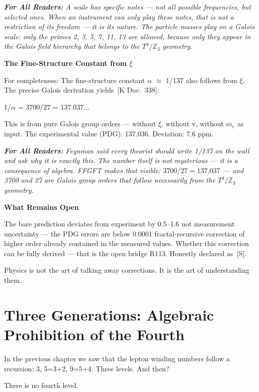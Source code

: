 \documentclass[11pt,oneside]{book}
\newcommand{\status}[1]{\penalty10000\,{\scriptsize\textcolor{gray!60}{[#1]}}}
\newenvironment{laierspur}{%
  \par\vspace{4pt}%
  \noindent\small\itshape\color{blue!60!black}%
  \textbf{For All Readers:}\enspace\ignorespaces}{%
  \par\vspace{4pt}\normalsize\normalfont\normalcolor}
\begin{document}
\begin{laierspur}
A scale has specific notes — not all possible frequencies, but selected
ones. When an instrument can only play these notes, that is not a
restriction of its freedom — it is its nature. The particle masses play on a
Galois scale: only the primes {2, 3, 5, 7, 11, 13} are allowed, because only
they appear in the Galois field hierarchy that belongs to the $T^4/\mathbb{Z}_3$
geometry.
\end{laierspur}

\textbf{The Fine-Structure Constant from $\xi$}

For completeness: The fine-structure constant $\alpha$ $\approx$ 1/137 also follows
from $\xi$. The precise Galois derivation yields \status{K Doc.~338}:

1/$\alpha$ = 3700/27 = 137.037...

This is from pure Galois group orders — without $\xi$, without v, without $m_e$
as input. The experimental value (PDG): 137.036. Deviation: 7.6 ppm.

\begin{laierspur}
Feynman said every theorist should write 1/137 on the wall and ask why
it is exactly this. The number itself is not mysterious --- it is a consequence
of algebra. FFGFT makes that visible:
$3700/27 = 137.037$ --- and 3700 and 27 are Galois group orders that follow
necessarily from the $T^4/\mathbb{Z}_3$ geometry.
\end{laierspur}

\textbf{What Remains Open}

The bare prediction deviates from experiment by 0.5–1.6%
not measurement uncertainty — the PDG errors are below 0.0001%
fractal-recursive correction of higher order already contained in the
measured values. Whether this correction can be fully derived — that is the
open bridge R113. Honestly declared as \status{S}.

Physics is not the art of talking away corrections. It is the art of
understanding them.


\chapter{Three Generations: Algebraic Prohibition of the Fourth}

In the previous chapter we saw that the lepton winding numbers follow a
recursion: 3, 5=3+2, 9=5+4. Three levels. And then?

There is no fourth level.
\end{document}
